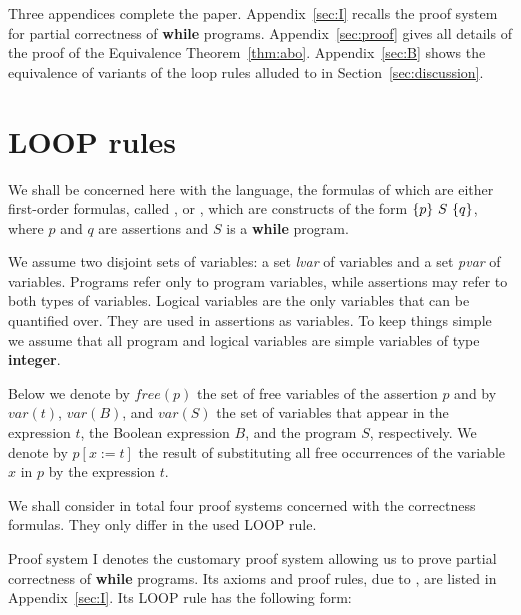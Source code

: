 \documentclass[manuscript, screen, review]{acmart}
\begin{document}
Three appendices complete the paper.
Appendix~\ref{sec:I} recalls the proof system for partial
correctness of {\bf while} programs.
Appendix~\ref{sec:proof} gives all details of the proof of the 
Equivalence Theorem~\ref{thm:abo}.
Appendix~\ref{sec:B} shows the equivalence of variants of the loop rules
alluded to in Section~\ref{sec:discussion}.





\section{LOOP rules}
\label{sec:loop-rules}

We shall be concerned here with the language, the formulas of
which are either first-order formulas, called , or
, which are constructs of the form $\mbox{$\{{p}\}\ {S}\ \{{q}\}$}$,
where $p$ and $q$ are assertions and $S$ is a \textbf{while} program.

We assume two disjoint sets of variables: a set \emph{lvar} of
 variables and a set \emph{pvar} of 
variables. Programs refer only to program variables, while assertions
may refer to both types of variables.  Logical variables are the only
variables that can be quantified over. They are used in assertions as
 variables.
To keep things simple we assume that all program and logical variables
are simple variables of  type \textbf{integer}.

Below we denote by $\mathit{free}(p)$
the set of free variables of the assertion $p$ and by $var(t)$, $var(B)$, and $var(S)$ 
the set of variables that appear in the
expression $t$, the Boolean expression $B$, and the program $S$, respectively.
%
% 
%
We denote by $p[x:=t]$ the result of substituting all free occurrences
of the variable $x$ in $p$ by the expression $t$. 



We shall consider in total four proof systems concerned with the
correctness formulas. They only differ in the used LOOP rule.

Proof system I denotes the customary proof system allowing us to prove 
partial correctness of {\bf while} programs.  
Its axioms and proof rules, due to \cite{Hoa69}, are listed in Appendix~\ref{sec:I}.
Its LOOP rule has the following form:
\III
\end{document}
